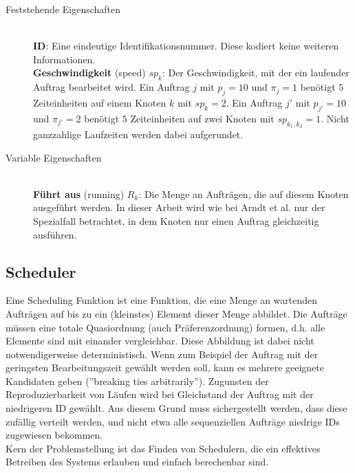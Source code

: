 \begin{description}
	\item[Feststehende Eigenschaften] \hfil \\
	\textbf{ID}: Eine eindeutige Identifikationsnummer. Diese kodiert keine weiteren Informationen.\\
	\textbf{Geschwindigkeit} (speed) $sp_k$: Der Geschwindigkeit, mit der ein laufender Auftrag bearbeitet wird. Ein Auftrag $j$ mit $p_j = 10$ und $\pi_j = 1$ benötigt $5$ Zeiteinheiten auf einem Knoten $k$ mit $sp_k = 2$. Ein Auftrag $j'$ mit $p_{j'} = 10$ und $\pi_{j'} = 2$ benötigt $5$ Zeiteinheiten auf zwei Knoten mit $sp_{k_1, k_2} = 1$. Nicht ganzzahlige Laufzeiten werden dabei aufgerundet.\\
	\item[Variable Eigenschaften] \hfil \\
	\textbf{Führt aus} (running) $R_k$: Die Menge an Aufträgen, die auf diesem Knoten ausgeführt werden. In dieser Arbeit wird wie bei Arndt et al. \cite{Arn99} nur der Spezialfall betrachtet, in dem Knoten nur einen Auftrag gleichzeitig ausführen.\\
\end{description}


\subsection{Scheduler}
Eine Scheduling Funktion ist eine Funktion, die eine Menge an wartenden Aufträgen auf bis zu ein (kleinstes) Element dieser Menge abbildet. Die Aufträge müssen eine totale Quasiordnung (auch  Präferenzordnung) formen, d.h. alle Elemente sind mit einander vergleichbar.
Diese Abbildung ist dabei nicht notwendigerweise deterministisch. Wenn zum Beispiel der Auftrag mit der geringsten Bearbeitungszeit gewählt werden soll, kann es mehrere geeignete Kandidaten geben (''breaking ties arbitrarily'')\cite[p.~7]{Kar97}. Zugunsten der Reproduzierbarkeit von Läufen wird bei Gleichstand der Auftrag mit der niedrigeren ID gewählt. Aus diesem Grund muss sichergestellt werden, dass diese zufällig verteilt werden, und nicht etwa alle sequenziellen Aufträge niedrige IDs zugewiesen bekommen.\\
Kern der Problemstellung ist das Finden von Schedulern, die ein effektives Betreiben des Systems erlauben und einfach berechenbar sind.

